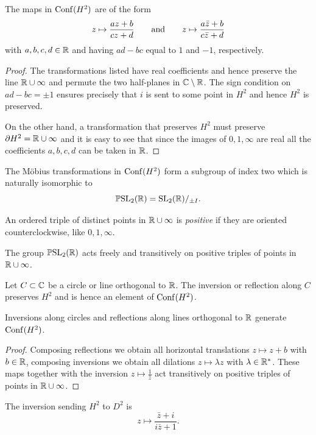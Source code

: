\begin{prop}
The maps in ${\rm Conf}(H^2)$ are of the form
$$z \mapsto \frac{az+b}{cz+d} \qquad {\rm and}
\qquad z \mapsto \frac{a\bar z+b}{c\bar z+d}$$
with $a,b,c,d \in \mathbb{R}$ and having $ad-bc$ equal to $1$ and $-1$, respectively. 
\end{prop}
\begin{proof}
The transformations listed have real coefficients and hence preserve the line $\mathbb{R}\cup \infty$ and permute the two half-planes in $\mathbb{C}\setminus \mathbb{R}$. The sign condition on $ad-bc = \pm 1$ ensures precisely that $i$ is sent to some point in $H^2$ and hence $H^2$ is preserved.

On the other hand, a transformation that preserves $H^2$ must preserve $\partial H^2 = \mathbb{R}\cup \infty$ and it is easy to see that since the images of $0,1,\infty$ are real all the coefficients $a,b,c,d$ can be taken in $\mathbb{R}$.
\end{proof}

The M\"obius transformations in ${\rm Conf}(H^2)$ form a subgroup of index two which is naturally isomorphic to
$$\mathbb{P}{\rm SL}_2(\mathbb{R}) = {\rm SL}_2(\mathbb{R})/_{\pm I}.$$

An ordered triple of distinct points in $\mathbb{R}\cup \infty$ is \emph{positive} if they are oriented counterclockwise, like $0,1, \infty$.

\begin{ex} \label{triple:ex}
The group $\mathbb{P}{\rm SL}_2(\mathbb{R})$ acts freely and transitively on positive triples of points in $\mathbb{R}\cup \infty$. 
\end{ex}

Let $C\subset \mathbb{C}$ be a circle or line orthogonal to $\mathbb{R}$. The inversion or reflection along $C$ preserves $H^2$ and is hence an element of ${\rm Conf}(H^2)$.

\begin{prop} \label{H2:generate}
Inversions along circles and reflections along lines orthogonal to $\mathbb{R}$ generate ${\rm Conf}(H^2)$.
\end{prop}
\begin{proof}
Composing reflections we obtain all horizontal translations $z \mapsto z+b$ with $b\in\mathbb{R}$, composing inversions we obtain all dilations $z \mapsto \lambda z$ with $\lambda \in \mathbb{R}^*$. These maps together with the inversion $z \mapsto \frac {1}{\bar z}$ act transitively on positive triples of points in $\mathbb{R}\cup \infty$.
\end{proof}

\begin{ex}
The inversion sending $H^2$ to $D^2$ is 
\begin{equation*} \label{anti:eq}
z \mapsto \frac{\bar z+i}{i\bar z+1}.
\end{equation*}
\end{ex}

